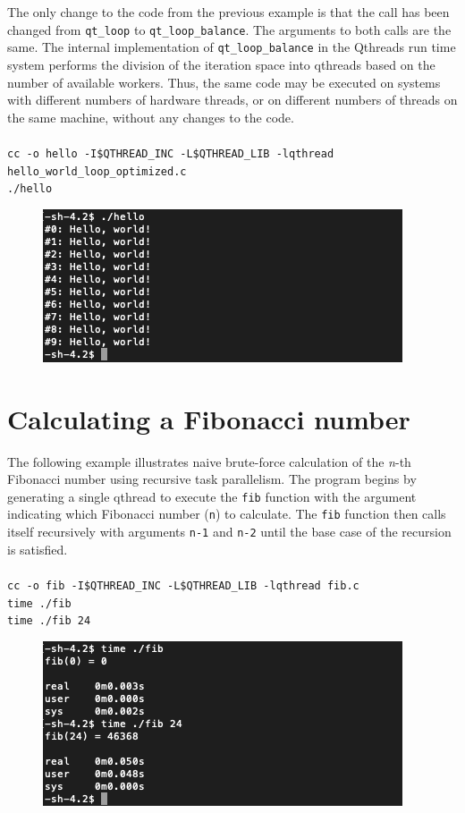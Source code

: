 \documentclass[12pt,fullpage]{article}
\begin{document}
The only change to the code from the previous example is that the call has been changed from {\tt qt\_loop} to {\tt qt\_loop\_balance}.  The arguments to both calls are the same.  The internal implementation of {\tt qt\_loop\_balance} in the Qthreads run time system performs the division of the iteration space into qthreads based on the number of available workers.  Thus, the same code may be executed on systems with different numbers of hardware threads, or on different numbers of threads on the same machine, without any changes to the code.
\\ \\
{\footnotesize{\tt cc -o hello -I\$QTHREAD\_INC -L\$QTHREAD\_LIB -lqthread hello\_world\_loop\_optimized.c}}
\\
{\footnotesize{\tt ./hello}}
\begin{figure}
\includegraphics{images/hello_world_optimized.png}
\end{figure}
\section{Calculating a Fibonacci number}

The following example illustrates naive brute-force calculation of the {\it n}-th Fibonacci number using recursive task parallelism. The program begins by generating a single qthread to execute the {\tt fib} function with the argument indicating which Fibonacci number ({\tt n}) to calculate.  The {\tt fib} function then calls itself recursively with arguments {\tt n-1} and {\tt n-2} until the base case of the recursion is satisfied.
\\ \\
{\footnotesize{\tt cc -o fib -I\$QTHREAD\_INC -L\$QTHREAD\_LIB -lqthread fib.c}}
\\
{\footnotesize{\tt time ./fib}}
\\
{\footnotesize{\tt time ./fib 24}}
\newpage


\begin{figure}
\includegraphics{images/fib.png}
\end{figure}
\end{document}
